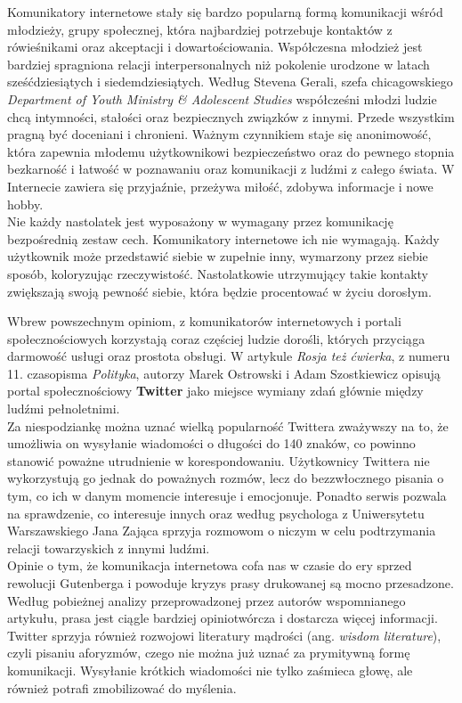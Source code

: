 \documentclass[a4paper,12pt]{article}
\begin{document}
\par Komunikatory internetowe stały się bardzo popularną formą komunikacji wśród młodzieży, grupy społecznej, która najbardziej potrzebuje kontaktów z rówieśnikami oraz akceptacji i dowartościowania. Współczesna młodzież jest bardziej spragniona relacji interpersonalnych niż pokolenie urodzone w latach sześćdziesiątych i siedemdziesiątych.
Według Stevena Gerali, szefa chicagowskiego \emph{Department of Youth Ministry \& Adolescent Studies} współcześni młodzi ludzie chcą intymności, stałości oraz bezpiecznych związków z innymi. Przede wszystkim pragną być doceniani i chronieni. Ważnym czynnikiem staje się anonimowość, która zapewnia młodemu użytkownikowi bezpieczeństwo oraz do pewnego stopnia bezkarność i łatwość w poznawaniu oraz komunikacji z ludźmi z całego świata.
W Internecie zawiera się przyjaźnie, przeżywa miłość, zdobywa informacje i nowe hobby.\\
Nie każdy nastolatek jest wyposażony w wymagany przez komunikację bezpośrednią zestaw cech. Komunikatory internetowe ich nie wymagają. Każdy użytkownik może przedstawić siebie w zupełnie inny, wymarzony przez siebie sposób, koloryzując rzeczywistość. Nastolatkowie utrzymujący takie kontakty zwiększają swoją pewność siebie, która będzie procentować w życiu dorosłym.

\par Wbrew powszechnym opiniom, z komunikatorów internetowych i portali społecznościowych korzystają coraz częściej ludzie dorośli, których przyciąga darmowość usługi oraz prostota obsługi. W artykule \emph{Rosja też ćwierka}, z numeru 11. czasopisma \emph{Polityka}, autorzy Marek Ostrowski i Adam Szostkiewicz opisują portal społecznościowy \textbf{Twitter} jako miejsce wymiany zdań głównie między ludźmi pełnoletnimi.\\
Za niespodziankę można uznać wielką popularność Twittera zważywszy na to, że umożliwia on wysyłanie wiadomości o długości do 140 znaków, co powinno stanowić poważne utrudnienie w korespondowaniu. Użytkownicy Twittera nie wykorzystują go jednak do poważnych rozmów, lecz do bezzwłocznego pisania o tym, co ich w danym momencie interesuje i emocjonuje. Ponadto serwis pozwala na sprawdzenie, co interesuje innych oraz według psychologa z Uniwersytetu Warszawskiego Jana Zająca sprzyja rozmowom o niczym w celu podtrzymania relacji towarzyskich z innymi ludźmi.\\
Opinie o tym, że komunikacja internetowa cofa nas w czasie do ery sprzed rewolucji Gutenberga i powoduje kryzys prasy drukowanej są mocno przesadzone. Według pobieżnej analizy przeprowadzonej przez autorów wspomnianego artykułu, prasa jest ciągle bardziej opiniotwórcza i dostarcza więcej informacji.\\
Twitter sprzyja również rozwojowi literatury mądrości (ang. \textit{wisdom literature}), czyli pisaniu aforyzmów, czego nie można już uznać za prymitywną formę komunikacji. Wysyłanie krótkich wiadomości nie tylko zaśmieca głowę, ale również potrafi zmobilizować do myślenia.
\end{document}
